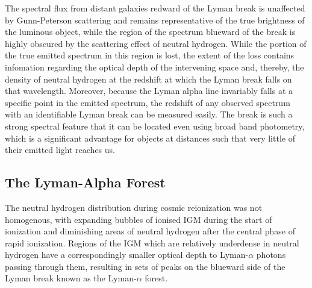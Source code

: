 		The spectral flux from distant galaxies redward of the Lyman break is unaffected by Gunn-Peterson scattering and remains representative of the true brightness of the luminous object, while the region of the spectrum blueward of the break is highly obscured by the scattering effect of neutral hydrogen. While the portion of the true emitted spectrum in this region is lost, the extent of the loss contains infomation regarding the optical depth of the intervening space and, thereby, the density of neutral hydrogen at the redshift at which the Lyman break falls on that wavelength. Moreover, because the Lyman alpha line invariably falls at a specific point in the emitted spectrum, the redshift of any observed spectrum with an identifiable Lyman break can be measured easily. The break is such a strong spectral feature that it can be located even using broad band photometry, which is a significant advantage for objects at distances such that very little of their emitted light reaches us.

	\subsection{The Lyman-Alpha Forest} %
	\label{sub:the_lyman_alpha_forest}
		The neutral hydrogen distribution during cosmic reionization was not homogenous, with expanding bubbles of ionised IGM during the start of ionization and diminishing areas of neutral hydrogen after the central phase of rapid ionization. Regions of the IGM which are relatively underdense in neutral hydrogen have a correspondingly smaller optical depth to Lyman-$\alpha$ photons passing through them, resulting in sets of peaks on the blueward side of the Lyman break known as the Lyman-$\alpha$ forest.

